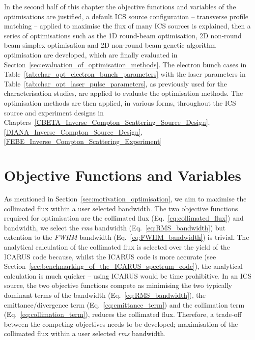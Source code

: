 \documentclass[../main.tex]{subfiles}
\begin{document}
In the second half of this chapter the objective functions and variables of the optimisations are justified, a default ICS source configuration -- transverse profile matching -- applied to maximise the flux of many ICS sources is explained, then a series of optimisations such as the 1D round-beam optimisation, 2D non-round beam simplex optimisation and 2D non-round beam genetic algorithm optimisation are developed, which are finally evaluated in Section~\ref{sec:evaluation_of_optimisation_methods}. The electron bunch cases in Table~\ref{tab:char_opt_electron_bunch_parameters} with the laser parameters in Table~\ref{tab:char_opt_laser_pulse_parameters},  as previously used for the characterisation studies, are applied to evaluate the optimisation methods. The optimisation methods are then applied, in various forms, throughout the ICS source and experiment designs in Chapters~\ref{CBETA_Inverse_Compton_Scattering_Source_Design}, \ref{DIANA_Inverse_Compton_Source_Design}, \ref{FEBE_Inverse_Compton_Scattering_Experiment}    

\section{Objective Functions and Variables}
\label{sec:objective_functions_and_variables}

As mentioned in Section~\ref{sec:motivation_optimisation}, we aim to maximise the collimated flux within a user selected bandwidth. The two objective functions required for optimisation are the collimated flux (Eq.~\ref{eq:collimated_flux}) and bandwidth, we select the \textit{rms} bandwidth (Eq.~\ref{eq:RMS_bandwidth}) but extention to the \textit{FWHM} bandwidth (Eq.~\ref{eq:FWHM_bandwidth}) is trivial. The analytical calculation of the collimated flux is selected over the yield of the \textsc{ICARUS} code because, whilst the \textsc{ICARUS} code is more accurate (see Section~\ref{sec:benchmarking_of_the_ICARUS_spectrum_code}), the analytical calculation is much quicker -- using \textsc{ICARUS} would be time prohibitive.  In an ICS source, the two objective functions compete as minimising the two typically dominant terms of the  bandwidth (Eq.~\ref{eq:RMS_bandwidth}), the emittance/divergence term (Eq.~\ref{eq:emittance_term}) and the collimation term (Eq.~\ref{eq:collimation_term}), reduces the collimated flux. Therefore, a trade-off between the competing objectives needs to be developed; maximisation of the collimated flux within a user selected \textit{rms} bandwidth. 
\end{document}
